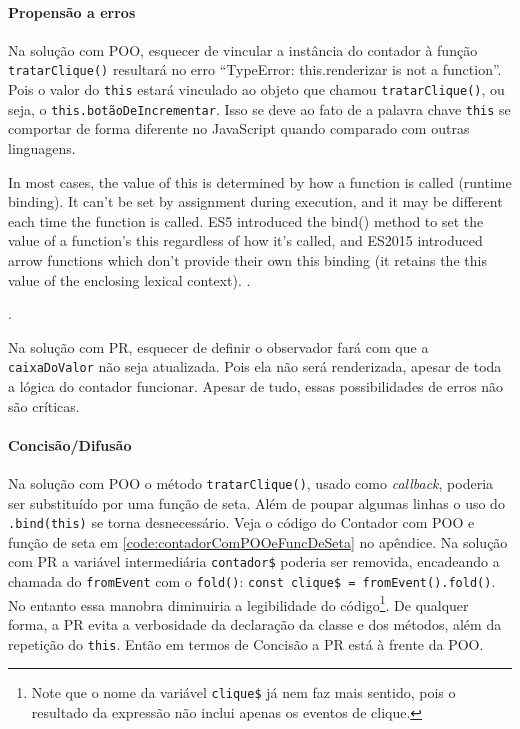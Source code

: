\paragraph{Propensão a erros}
\label{sec:orgffd44fd}
Na solução com POO, esquecer de vincular a instância do contador à função
\texttt{tratarClique()} resultará no erro “TypeError: this.renderizar is not a
function”.
Pois o valor do \texttt{this} estará vinculado ao objeto que chamou
\texttt{tratarClique()}, ou seja, o \texttt{this.botãoDeIncrementar}.
Isso se deve ao fato de a palavra chave \texttt{this} se comportar de forma
diferente no JavaScript quando comparado com outras linguagens.

\begin{citacao}
In most cases, the value of this is determined by how a function is called
(runtime binding). It can't be set by assignment during execution, and it
may be different each time the function is called. ES5 introduced the
bind() method to set the value of a function's this regardless of how it's
called, and ES2015 introduced arrow functions which don't provide their own
this binding (it retains the this value of the enclosing lexical context).
\cite{This2020}.
\end{citacao}

.

Na solução com PR, esquecer de definir o observador fará com que a
\texttt{caixaDoValor} não seja atualizada.
Pois ela não será renderizada, apesar de toda a lógica do contador
funcionar.
Apesar de tudo, essas possibilidades de erros não são críticas.

\paragraph{Concisão/Difusão}
\label{sec:orga12290d}
Na solução com POO o método \texttt{tratarClique()}, usado como \emph{callback},
poderia ser substituído por uma função de seta.
Além de poupar algumas linhas o uso do \texttt{.bind(this)} se torna
desnecessário.
Veja o código do Contador com POO e função de seta em
\ref{code:contadorComPOOeFuncDeSeta} no apêndice.
Na solução com PR a variável intermediária \texttt{contador\$} poderia ser
removida, encadeando a chamada do \texttt{fromEvent} com o \texttt{fold()}:
\texttt{const clique\$ = fromEvent().fold()}.
No entanto essa manobra diminuiria a legibilidade do
código\footnote{Note que o nome da variável \texttt{clique\$} já nem faz mais
sentido, pois o resultado da expressão não inclui apenas os eventos de clique.}.
De qualquer forma, a PR evita a verbosidade da declaração da classe e dos
métodos, além da repetição do \texttt{this}.
Então em termos de Concisão a PR está à frente da POO.

